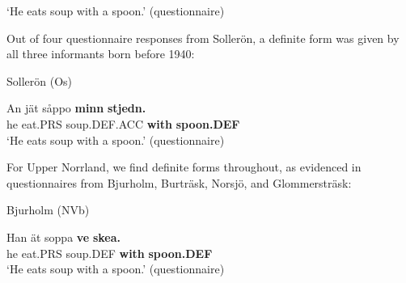 \glt ‘He eats soup with a spoon.’ (questionnaire)

\z

Out of four questionnaire responses from Sollerön, a definite form was given by all three informants born before 1940:


\item 

Sollerön (Os)



 \ea\label{}
\gll An  jät  såppo  \textbf{minn}\textbf{  stjedn.} \\


he  eat.PRS  soup.DEF.ACC  \textbf{with} \textbf{spoon.DEF} \\

\glt ‘He eats soup with a spoon.’ (questionnaire)

\z

For Upper Norrland, we find definite forms throughout, as evidenced in questionnaires from Bjurholm, Burträsk, Norsjö, and Glommersträsk:


\item 

Bjurholm (NVb)



 \ea\label{}
\gll Han  ät  soppa  \textbf{ve} \textbf{skea.} \\


he  eat.PRS  soup.DEF  \textbf{with} \textbf{spoon.DEF} \\

\glt ‘He eats soup with a spoon.’ (questionnaire)

\z

